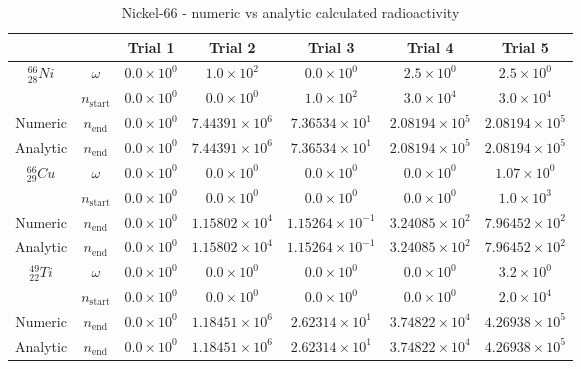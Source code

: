 \begin{table}[h]
\begin{center}
\begin{longtable}{c c c c c c c}
\hline\hline
 &  & Trial 1 & Trial 2 & Trial 3 & Trial 4 & Trial 5 \\
\hline\hline
${}^{66}_{28}Ni$ & $\omega$ & 
${0.0} \times 10^{0}$ & ${1.0} \times 10^{2}$ & ${0.0} \times 10^{0}$ &
${2.5} \times 10^{0}$ & ${2.5} \times 10^{0}$ \\
 & $n_{\text{start}}$ & 
${0.0} \times 10^{0}$ & ${0.0} \times 10^{0}$ & ${1.0} \times 10^{2}$ & 
${3.0} \times 10^{4}$ & ${3.0} \times 10^{4}$ \\
Numeric & $n_{\text{end}}$ & 
${0.0} \times 10^{0}$ & ${7.44391} \times 10^{6}$ & ${7.36534} \times 10^{1}$ & 
${2.08194} \times 10^{5}$ & ${2.08194} \times 10^{5}$ \\
Analytic & $n_{\text{end}}$ & 
${0.0} \times 10^{0}$ & ${7.44391} \times 10^{6}$ & ${7.36534} \times 10^{1}$ & 
${2.08194} \times 10^{5}$ & ${2.08194} \times 10^{5}$ \\
\hline
${}^{66}_{29}Cu$ & $\omega$ & 
${0.0} \times 10^{0}$ & ${0.0} \times 10^{0}$ & ${0.0} \times 10^{0}$ &
${0.0} \times 10^{0}$ & ${1.07} \times 10^{0}$ \\
 & $n_{\text{start}}$ & 
${0.0} \times 10^{0}$ & ${0.0} \times 10^{0}$ & ${0.0} \times 10^{0}$ &
${0.0} \times 10^{0}$ & ${1.0} \times 10^{3}$ \\
Numeric & $n_{\text{end}}$ & 
${0.0} \times 10^{0}$ & ${1.15802} \times 10^{4}$ & ${1.15264} \times 10^{-1}$ & 
${3.24085} \times 10^{2}$ & ${7.96452} \times 10^{2}$ \\
Analytic & $n_{\text{end}}$ & 
${0.0} \times 10^{0}$ & ${1.15802} \times 10^{4}$ & ${1.15264} \times 10^{-1}$ & 
${3.24085} \times 10^{2}$ & ${7.96452} \times 10^{2}$ \\
\hline
${}^{49}_{22}Ti$ & $\omega$ & 
${0.0} \times 10^{0}$ & ${0.0} \times 10^{0}$ & ${0.0} \times 10^{0}$ &
${0.0} \times 10^{0}$ & ${3.2} \times 10^{0}$ \\
 & $n_{\text{start}}$ & 
${0.0} \times 10^{0}$ & ${0.0} \times 10^{0}$ & ${0.0} \times 10^{0}$ &
${0.0} \times 10^{0}$ & ${2.0} \times 10^{4}$ \\
Numeric & $n_{\text{end}}$ & 
${0.0} \times 10^{0}$ & ${1.18451} \times 10^{6}$ & ${2.62314} \times 10^{1}$ & 
${3.74822} \times 10^{4}$ & ${4.26938} \times 10^{5}$ \\
Analytic & $n_{\text{end}}$ & 
${0.0} \times 10^{0}$ & ${1.18451} \times 10^{6}$ & ${2.62314} \times 10^{1}$ & 
${3.74822} \times 10^{4}$ & ${4.26938} \times 10^{5}$ \\
\hline\hline
\end{longtable}
\end{center}
\caption{Nickel-66 - numeric vs analytic calculated radioactivity}
\label{table:ni66trialdata}
\end{table}





